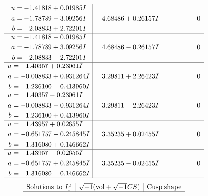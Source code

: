 \documentclass[1p]{elsarticle_modified}
\theoremstyle{definition}
\newcommand{\I}{\sqrt{-1}}
\begin{document}
$$\begin{array}{c|c|c}
\begin{aligned}
u &= -1.41818 + 0.01985 I \\
a &= -1.78789 - 3.09256 I \\
b &= \phantom{-}2.08833 + 2.72201 I\end{aligned}
 & \phantom{-}4.68486 + 0.26157 I & \phantom{-0.000000 } 0 \\ \hline\begin{aligned}
u &= -1.41818 - 0.01985 I \\
a &= -1.78789 + 3.09256 I \\
b &= \phantom{-}2.08833 - 2.72201 I\end{aligned}
 & \phantom{-}4.68486 - 0.26157 I & \phantom{-0.000000 } 0 \\ \hline\begin{aligned}
u &= \phantom{-}1.40357 + 0.23061 I \\
a &= -0.008833 + 0.931264 I \\
b &= \phantom{-}1.236100 - 0.413960 I\end{aligned}
 & \phantom{-}3.29811 + 2.26423 I & \phantom{-0.000000 } 0 \\ \hline\begin{aligned}
u &= \phantom{-}1.40357 - 0.23061 I \\
a &= -0.008833 - 0.931264 I \\
b &= \phantom{-}1.236100 + 0.413960 I\end{aligned}
 & \phantom{-}3.29811 - 2.26423 I & \phantom{-0.000000 } 0 \\ \hline\begin{aligned}
u &= \phantom{-}1.43957 + 0.02655 I \\
a &= -0.651757 - 0.245845 I \\
b &= \phantom{-}1.316080 + 0.146662 I\end{aligned}
 & \phantom{-}3.35235 + 0.02455 I & \phantom{-0.000000 } 0 \\ \hline\begin{aligned}
u &= \phantom{-}1.43957 - 0.02655 I \\
a &= -0.651757 + 0.245845 I \\
b &= \phantom{-}1.316080 - 0.146662 I\end{aligned}
 & \phantom{-}3.35235 - 0.02455 I & \phantom{-0.000000 } 0\\
 \hline 
 \end{array}$$\newpage$$\begin{array}{c|c|c}  
\text{Solutions to }I^u_{1}& \I (\text{vol} + \sqrt{-1}CS) & \text{Cusp shape}\\
 \hline 

\end{array}$$
\end{document}
